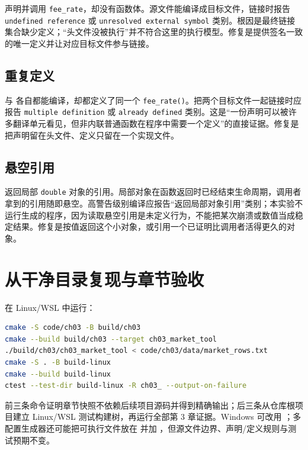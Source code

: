  声明并调用 \texttt{fee\_rate}，却没有函数体。源文件能编译成目标文件，链接时报告 \texttt{undefined reference} 或 \texttt{unresolved external symbol} 类别。根因是最终链接集合缺少定义；“头文件没被执行”并不符合这里的执行模型。修复是提供签名一致的唯一定义并让对应目标文件参与链接。

\subsection{重复定义}

 与  各自都能编译，却都定义了同一个 \texttt{fee\_rate()}。把两个目标文件一起链接时应报告 \texttt{multiple definition} 或 \texttt{already defined} 类别。这是“一份声明可以被许多翻译单元看见，但非内联普通函数在程序中需要一个定义”的直接证据。修复是把声明留在头文件、定义只留在一个实现文件。

\subsection{悬空引用}

 返回局部 \texttt{double} 对象的引用。局部对象在函数返回时已经结束生命周期，调用者拿到的引用随即悬空。高警告级别编译应报告“返回局部对象引用”类别；本实验不运行生成的程序，因为读取悬空引用是未定义行为，不能把某次崩溃或数值当成稳定结果。修复是按值返回这个小对象，或引用一个已证明比调用者活得更久的对象。

\section{从干净目录复现与章节验收}

在 Linux/WSL 中运行：

\begin{lstlisting}[language=bash,numbers=none]
cmake -S code/ch03 -B build/ch03
cmake --build build/ch03 --target ch03_market_tool
./build/ch03/ch03_market_tool < code/ch03/data/market_rows.txt
cmake -S . -B build-linux
cmake --build build-linux
ctest --test-dir build-linux -R ch03_ --output-on-failure
\end{lstlisting}

前三条命令证明章节快照不依赖后续项目源码并得到精确输出；后三条从仓库根项目建立 Linux/WSL 测试构建树，再运行全部第 3 章证据。Windows 可改用 ；多配置生成器还可能把可执行文件放在  并加 ，但源文件边界、声明/定义规则与测试预期不变。

